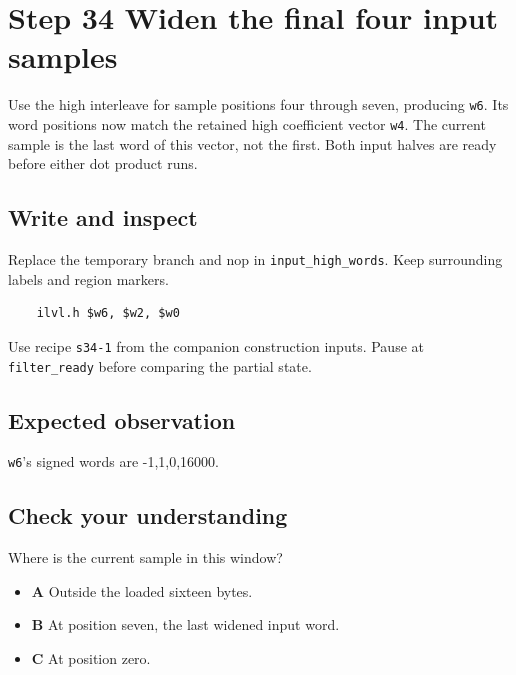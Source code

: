 \section{Step 34 Widen the final four input samples}\label{fir-s34}

Use the high interleave for sample positions four through seven, producing \texttt{w6}. Its word positions now match the retained high coefficient vector \texttt{w4}. The current sample is the last word of this vector, not the first. Both input halves are ready before either dot product runs.

\subsection{Write and inspect}
Replace the temporary branch and nop in \texttt{input\_high\_words}. Keep surrounding labels and region markers.

\begin{verbatim}
    ilvl.h $w6, $w2, $w0
\end{verbatim}
Use recipe \texttt{s34-1} from the companion construction inputs. Pause at \texttt{filter\_ready} before comparing the partial state.

\subsection{Expected observation}
\texttt{w6}’s signed words are -1,1,0,16000.

\subsection{Check your understanding}
Where is the current sample in this window?

\begin{itemize}
  \item \textbf{A} Outside the loaded sixteen bytes.
  \item \textbf{B} At position seven, the last widened input word.
  \item \textbf{C} At position zero.
\end{itemize}
